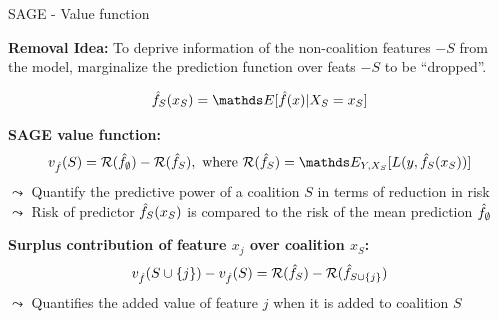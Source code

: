 \documentclass[10pt,compress,t,notes=noshow, xcolor=table]{beamer}
\begin{document}
\begin{frame}{SAGE - Value function}
  
 \textbf{Removal Idea:} %
 To deprive information of the non-coalition features $-S$ from the model, marginalize the prediction function over feats $-S$ to be ``dropped''.

$$\fh_S(x_S) = \E[\fh(x) | X_S = x_S]$$



\pause
\lz

\textbf{SAGE value function:}  $$v_{\fh}(S) = \risk(\fh_{\emptyset}) - \risk(\fh_{S}), \text{ where } \risk(\fh_{S}) = \E_{Y, X_S}[L(y, \fh_S(x_S))]$$
$\leadsto$ Quantify the predictive power of a coalition $S$ in terms of reduction in risk \\
$\leadsto$ Risk of predictor $\hat{f}_S(x_S)$ is compared to the risk of the mean prediction $\hat{f}_{\emptyset}$


\pause
\lz

\textbf{Surplus contribution of feature $x_j$ over coalition $x_S$:}  
$$v_{\hat{f}}(S \cup \{j\}) - v_{\hat{f}}(S) = \mathcal{R}(\hat{f}_{S})-\mathcal{R}(\hat{f}_{S \cup \{j\}})$$
$\leadsto$ Quantifies the added value of feature $j$ when it is added to coalition $S$


\end{frame}
\end{document}
